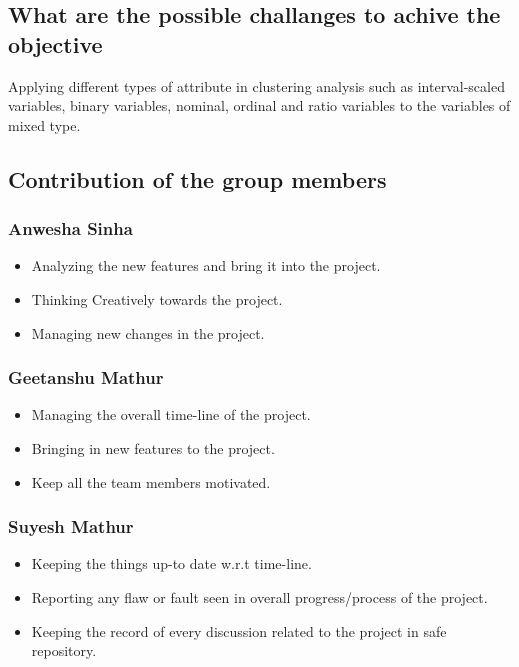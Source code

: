 \newpage

\subsection{What are the possible challanges to achive the objective}
Applying different types of attribute in clustering analysis such as interval-scaled variables, binary variables, nominal, ordinal and ratio variables to the variables of mixed type.

\subsection{Contribution of the group members}
\subsubsection{Anwesha Sinha}

\begin{itemize}
    \item Analyzing the new features and bring it into the project.
    \item Thinking Creatively towards the project.
    \item Managing new changes in the project.
\end{itemize}

\subsubsection{Geetanshu Mathur}

\begin{itemize}
    \item Managing the overall time-line of the project.
    \item Bringing in new features to the project.
    \item Keep all the team members motivated.
\end{itemize}

\subsubsection{Suyesh Mathur}
\begin{itemize}
    \item Keeping the things up-to date w.r.t time-line.
    \item Reporting any flaw or fault seen in overall progress/process of the project.
    \item Keeping the record of every discussion related to the project in safe repository.
\end{itemize}